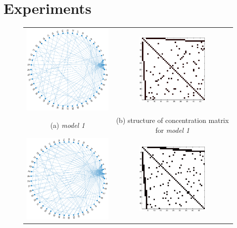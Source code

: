 \documentclass{article}
\begin{document}
\section{Experiments}

\begin{figure}
\label{fig:synth}
\center
\begin{tabular}{cc}
      \includegraphics[width=6cm]{fig/disjoint_graph} 
  &   \includegraphics[width=3.5cm]{fig/disjoint_true}
   \\    (a) \textit{model 1} & (b)  structure of concentration matrix for \textit{model 1} \\
      \includegraphics[width=6cm]{fig/over_graph} 
  &   \includegraphics[width=3.5cm]{fig/overlap_true}

\end{tabular}
\end{figure}
\end{document}
